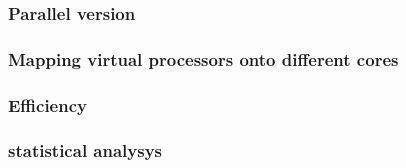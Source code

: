 \subsubsection*{Parallel version}
\subsubsection*{Mapping virtual processors onto different cores} 
\subsubsection*{Efficiency} 
\subsubsection*{statistical analysys}
